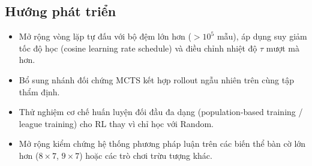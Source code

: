 \documentclass[11pt, a4paper]{article}
\begin{document}
\subsection{Hướng phát triển}
\begin{itemize}
    \item Mở rộng vòng lặp tự đấu với bộ đệm lớn hơn ($>10^5$ mẫu), áp dụng suy giảm tốc độ học (cosine learning rate schedule) và điều chỉnh nhiệt độ $\tau$ mượt mà hơn.
    \item Bổ sung nhánh đối chứng MCTS kết hợp rollout ngẫu nhiên trên cùng tập thẩm định.
    \item Thử nghiệm cơ chế huấn luyện đối đầu đa dạng (population-based training / league training) cho RL thay vì chỉ học với Random.
    \item Mở rộng kiểm chứng hệ thống phương pháp luận trên các biến thể bàn cờ lớn hơn ($8 \times 7$, $9 \times 7$) hoặc các trò chơi trừu tượng khác.
\end{itemize}
\end{document}
